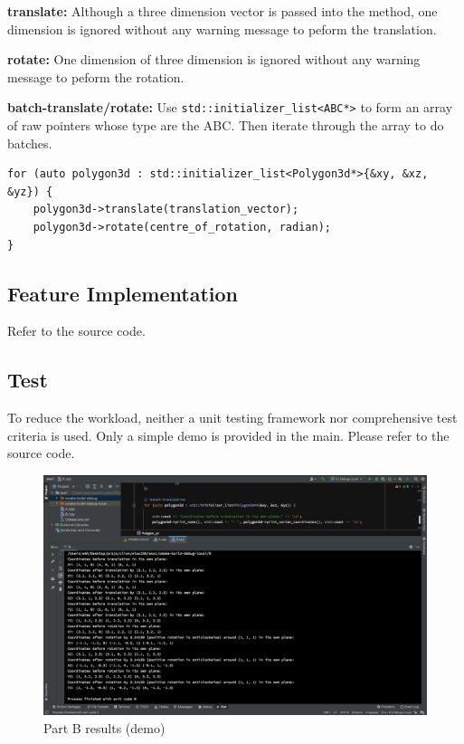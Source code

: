 \documentclass[12pt, a4paper]{article}
\begin{document}
\textbf{translate:} Although a three dimension vector is passed into the method, one dimension is ignored without any warning message to peform the translation.

\textbf{rotate:} One dimension of three dimension is ignored without any warning message to peform the rotation.

\textbf{batch-translate/rotate:} Use \lstinline{std::initializer_list<ABC*>} to form an array of raw pointers whose type are the ABC. Then iterate through the array to do batches.
\begin{lstlisting}[frame=single, breaklines]
for (auto polygon3d : std::initializer_list<Polygon3d*>{&xy, &xz, &yz}) {
    polygon3d->translate(translation_vector);
    polygon3d->rotate(centre_of_rotation, radian);
}
\end{lstlisting}

\subsection{Feature Implementation}
Refer to the source code.

\subsection{Test}
To reduce the workload, neither a unit testing framework nor comprehensive test criteria is used. Only a simple demo is provided in the main. Please refer to the source code.

\begin{figure}[htbp]
  \begin{centering}
    \includegraphics[width=1\textwidth]{B_results}
    \caption{Part B results (demo)}
  \end{centering}
  \label{fig:B_demo}
\end{figure}
\end{document}
